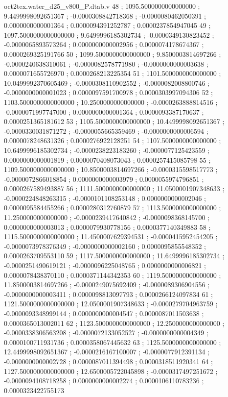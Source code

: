 \begin{filecontents}[overwrite]{oct2tex.water_d25_v800_P.dtab.v}
48 ; 1095.5000000000000000 ; 9.4499998092651367 ; -0.0000308842718368 ; -0.0000080462050391 ; 0.0000000000001364 ; 0.0000094391252787 ; 0.0000237854947045
49 ; 1097.5000000000000000 ; 9.6499996185302734 ; -0.0000349130823452 ; -0.0000065893573264 ; 0.0000000000002956 ; 0.0000074178674367 ; 0.0000269325191766
50 ; 1099.5000000000000000 ; 9.8500003814697266 ; -0.0000240638310061 ; -0.0000082578771980 ; -0.0000000000003638 ; 0.0000071655726970 ; 0.0000268213225354
51 ; 1101.5000000000000000 ; 10.0499992370605469 ; -0.0000308110902552 ; -0.0000082008800746 ; -0.0000000000001023 ; 0.0000097591700978 ; 0.0000303997094306
52 ; 1103.5000000000000000 ; 10.2500000000000000 ; -0.0000263888814516 ; -0.0000071997747000 ; 0.0000000000001364 ; 0.0000093387170637 ; 0.0000251365181612
53 ; 1105.5000000000000000 ; 10.4499998092651367 ; -0.0000330031871272 ; -0.0000055665359469 ; -0.0000000000006594 ; 0.0000078248631326 ; 0.0000276922128251
54 ; 1107.5000000000000000 ; 10.6499996185302734 ; -0.0000238223183260 ; -0.0000077125423559 ; 0.0000000000001819 ; 0.0000070408073043 ; 0.0000257415085798
55 ; 1109.5000000000000000 ; 10.8500003814697266 ; -0.0000315598517773 ; -0.0000072866018854 ; 0.0000000000003979 ; 0.0000055974796851 ; 0.0000267589493887
56 ; 1111.5000000000000000 ; 11.0500001907348633 ; -0.0000224848263315 ; -0.0000101108253148 ; 0.0000000000002046 ; 0.0000095584455266 ; 0.0000280312760879
57 ; 1113.5000000000000000 ; 11.2500000000000000 ; -0.0000239417640842 ; -0.0000098368145700 ; 0.0000000000003013 ; 0.0000079930778156 ; 0.0000377140349883
58 ; 1115.5000000000000000 ; 11.4500007629394531 ; -0.0000415952454205 ; -0.0000073978376349 ; -0.0000000000002160 ; 0.0000095855548352 ; 0.0000263709553110
59 ; 1117.5000000000000000 ; 11.6499996185302734 ; -0.0000251490619121 ; -0.0000096225048765 ; 0.0000000000006821 ; 0.0000078438370110 ; 0.0000371144342353
60 ; 1119.5000000000000000 ; 11.8500003814697266 ; -0.0000249075692409 ; -0.0000089306904556 ; -0.0000000000003411 ; 0.0000098813097793 ; 0.0000266124097834
61 ; 1121.5000000000000000 ; 12.0500001907348633 ; -0.0000279704963759 ; -0.0000093348999144 ; 0.0000000000004547 ; 0.0000087011503638 ; 0.0000365013002011
62 ; 1123.5000000000000000 ; 12.2500000000000000 ; -0.0000338306563208 ; -0.0000072133052527 ; -0.0000000000004349 ; 0.0000100711931736 ; 0.0000358067445632
63 ; 1125.5000000000000000 ; 12.4499998092651367 ; -0.0000216167100007 ; -0.0000077912391134 ; -0.0000000000002728 ; 0.0000087011394498 ; 0.0000318511920341
64 ; 1127.5000000000000000 ; 12.6500005722045898 ; -0.0000317497251672 ; -0.0000094108718258 ; 0.0000000000002274 ; 0.0000106110783236 ; 0.0000323422755173

\end{filecontents}
